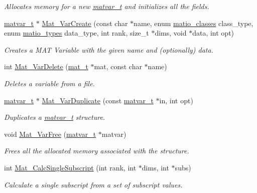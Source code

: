 \begin{DoxyCompactItemize}
\begin{DoxyCompactList}\small\item\em Allocates memory for a new \hyperlink{structmatvar__t}{matvar\-\_\-t} and initializes all the fields. \end{DoxyCompactList}\item 
\hyperlink{structmatvar__t}{matvar\-\_\-t} $\ast$ \hyperlink{group__MAT_ga1c54a84bb4d810c6fccdb8869489eac4}{Mat\-\_\-\-Var\-Create} (const char $\ast$name, enum \hyperlink{group__MAT_gad4d60ae7b709fc81bfd744fb4c857c40}{matio\-\_\-classes} class\-\_\-type, enum \hyperlink{group__MAT_gacf7b3b879282b7ab3a51190e49bf3453}{matio\-\_\-types} data\-\_\-type, int rank, size\-\_\-t $\ast$dims, void $\ast$data, int opt)
\begin{DoxyCompactList}\small\item\em Creates a M\-A\-T Variable with the given name and (optionally) data. \end{DoxyCompactList}\item 
int \hyperlink{group__MAT_gabf139e48d48177e5069338fa2919c60a}{Mat\-\_\-\-Var\-Delete} (\hyperlink{group__MAT_gab0fc888f5a5d79943b16284b1f91c2e8}{mat\-\_\-t} $\ast$mat, const char $\ast$name)
\begin{DoxyCompactList}\small\item\em Deletes a variable from a file. \end{DoxyCompactList}\item 
\hyperlink{structmatvar__t}{matvar\-\_\-t} $\ast$ \hyperlink{group__MAT_ga7ef80c5d99d7918b2b09db3bea106ecc}{Mat\-\_\-\-Var\-Duplicate} (const \hyperlink{structmatvar__t}{matvar\-\_\-t} $\ast$in, int opt)
\begin{DoxyCompactList}\small\item\em Duplicates a \hyperlink{structmatvar__t}{matvar\-\_\-t} structure. \end{DoxyCompactList}\item 
void \hyperlink{group__MAT_ga1d14716f7450530fd1c9d02413787f0e}{Mat\-\_\-\-Var\-Free} (\hyperlink{structmatvar__t}{matvar\-\_\-t} $\ast$matvar)
\begin{DoxyCompactList}\small\item\em Frees all the allocated memory associated with the structure. \end{DoxyCompactList}\item 
int \hyperlink{group__MAT_ga9b8d09f631538b14ca29792e0334e349}{Mat\-\_\-\-Calc\-Single\-Subscript} (int rank, int $\ast$dims, int $\ast$subs)
\begin{DoxyCompactList}\small\item\em Calculate a single subscript from a set of subscript values. \end{DoxyCompactList}\item 

\end{DoxyCompactItemize}
